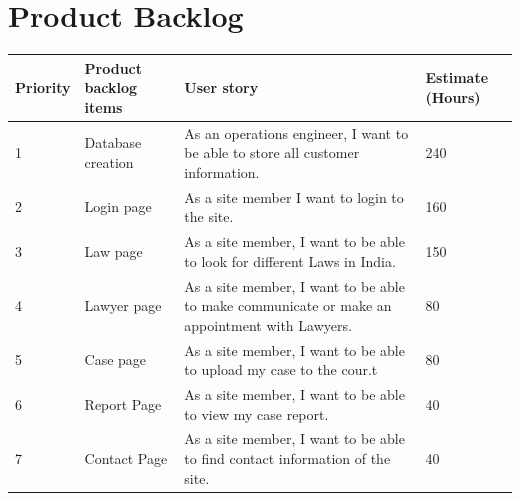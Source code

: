 \section{Product Backlog}
%
%
\renewcommand{\arraystretch}{1.25}
\begin{center}
\begin{tabular}{|m{}|m{}|m{}|m{}|}
\hline
{\bf Priority} & {\bf Product backlog items} & {\bf User story} & {\bf Estimate (Hours)}\\
\hline
1 & Database creation & As an operations engineer, I want to be able to store all customer information.  & 240 \\
\hline
2 & Login page & As a site member I want to login to the site. & 160 \\
\hline
3 & Law page & As a site member, I want to be able to look for different Laws in India. & 150\\
\hline
4 & Lawyer page & As a site member, I want to be able to make communicate or make an appointment with Lawyers. & 80\\
\hline
5 & Case page &As a site member, I want to be able to upload my case to the cour.t& 80 \\
\hline
6 & Report Page & As a site member, I want to be able to view my case report. & 40\\
\hline
7 & Contact Page & As a site member,  I want to be able to find contact information of the site. & 40\\
\hline

\end{tabular}
\end{center}
%
